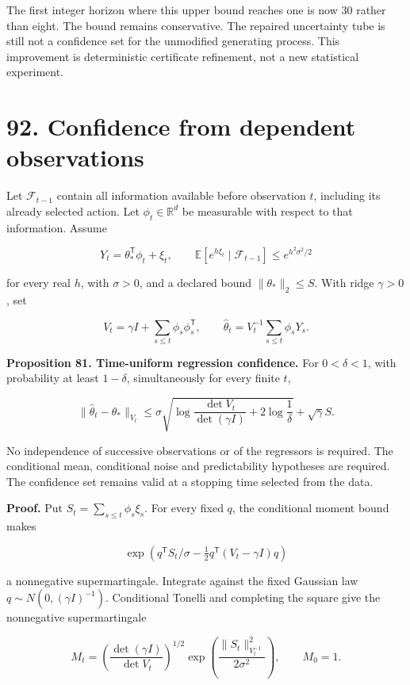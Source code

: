 \documentclass[11pt,letterpaper]{article}
\begin{document}
The first integer horizon where this upper bound reaches one is now 30
rather than eight. The bound remains conservative. The repaired
uncertainty tube is still not a confidence set for the unmodified
generating process. This improvement is deterministic certificate
refinement, not a new statistical experiment.

\section{92. Confidence from dependent
observations}\label{confidence-from-dependent-observations}

Let \(\mathcal F_{t-1}\) contain all information available before
observation \(t\), including its already selected action. Let
\(\phi_t\in\mathbb R^d\) be measurable with respect to that information.
Assume

\[
Y_t=\theta_*^{\mathsf T}\phi_t+\xi_t,
\qquad
\mathbb E[e^{h\xi_t}\mid\mathcal F_{t-1}]
\leq e^{h^2\sigma^2/2}
\]

for every real \(h\), with \(\sigma>0\), and a declared bound
\(\|\theta_*\|_2\leq S\). With ridge \(\gamma>0\), set

\[
V_t=\gamma I+\sum_{s\leq t}\phi_s\phi_s^{\mathsf T},
\qquad
\widehat\theta_t=V_t^{-1}\sum_{s\leq t}\phi_sY_s.
\]

\textbf{Proposition 81. Time-uniform regression confidence.} For
\(0<\delta<1\), with probability at least \(1-\delta\), simultaneously
for every finite \(t\),

\[
\boxed{
\|\widehat\theta_t-\theta_*\|_{V_t}
\leq
\sigma\sqrt{
\log\frac{\det V_t}{\det(\gamma I)}+2\log\frac1\delta
}
+\sqrt\gamma S.
}
\]

No independence of successive observations or of the regressors is
required. The conditional mean, conditional noise and predictability
hypotheses are required. The confidence set remains valid at a stopping
time selected from the data.

\textbf{Proof.} Put \(S_t=\sum_{s\leq t}\phi_s\xi_s\). For every fixed
\(q\), the conditional moment bound makes

\[
\exp\left(q^{\mathsf T}S_t/\sigma
-\tfrac12q^{\mathsf T}(V_t-\gamma I)q\right)
\]

a nonnegative supermartingale. Integrate against the fixed Gaussian law
\(q\sim N(0,(\gamma I)^{-1})\). Conditional Tonelli and completing the
square give the nonnegative supermartingale

\[
M_t=
\left(\frac{\det(\gamma I)}{\det V_t}\right)^{1/2}
\exp\left(\frac{\|S_t\|_{V_t^{-1}}^2}{2\sigma^2}\right),
\qquad M_0=1.
\]
\end{document}
